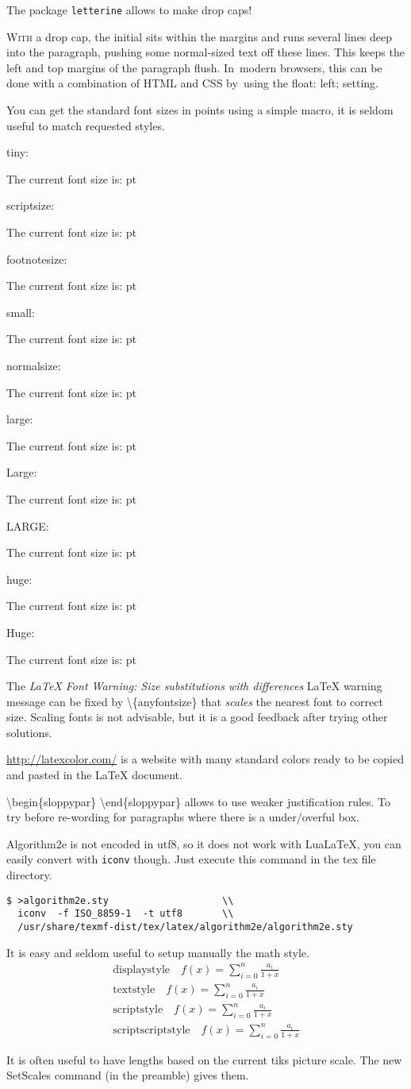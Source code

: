 \documentclass[a4paper]{article}
\makeatletter
\newlength{\scaledx}
\newlength{\scaledy}
\newcommand\SetScales{%
  \pgfpointxy{1}{1}%
  \pgfextractx{\scaledx}{}%
  \pgfextracty{\scaledy}{}%
}
\newcommand\thefontsize[1]{{#1 The current font size is: \f@size pt\par}}
\makeatother
\begin{document}
\vskip5mm
The package \texttt{letterine} allows to make drop caps!

\lettrine[lines=3,slope=-4pt,nindent=-4pt,findent=2pt]{W}{ith} a drop cap, the initial sits
within the margins and runs several lines deep into the paragraph, pushing some
normal-sized text off these lines. This keeps the left and top margins of the
paragraph flush.  In~modern browsers, this can be done with a combination of
HTML and CSS by~using the float: left; setting.

You can get the standard font sizes in points using a simple macro, it is
seldom useful to match requested styles.

tiny: \thefontsize\tiny
scriptsize: \thefontsize\scriptsize
footnotesize: \thefontsize\footnotesize
small: \thefontsize\small
normalsize: \thefontsize\normalsize
large: \thefontsize\large
Large: \thefontsize\Large
LARGE: \thefontsize\LARGE
huge: \thefontsize\huge
Huge: \thefontsize\Huge


The \emph{LaTeX Font Warning: Size substitutions with differences} \LaTeX{}
warning message can be fixed by \textbackslash{}\{anyfontsize\} that
\emph{scales} the nearest font to correct size. Scaling fonts is not advisable,
but it is a good feedback after trying other solutions.



\url{http://latexcolor.com/} is a website with many standard colors ready to be copied
and pasted in the \LaTeX{} document.

\textbackslash{}begin\{sloppypar\} \textbackslash{}end\{sloppypar\} allows to
use weaker justification rules. To try before re-wording for paragraphs where
there is a under/overful box.

Algorithm2e is not encoded in utf8, so it does not work with LuaLaTeX, you can
easily convert with \texttt{iconv} though. Just execute this command in the tex
file directory.
\begin{verbatim}
$ >algorithm2e.sty                    \\
  iconv  -f ISO_8859-1  -t utf8       \\
  /usr/share/texmf-dist/tex/latex/algorithm2e/algorithm2e.sty
\end{verbatim}

It is easy and seldom useful to setup manually the math style.
\begin{eqnarray*}
\mathrm{displaystyle}\quad      \displaystyle      f(x) = \sum_{i=0}^{n} \frac{a_i}{1+x} \\
\mathrm{textstyle}\quad         \textstyle         f(x) = \sum_{i=0}^{n} \frac{a_i}{1+x} \\
\mathrm{scriptstyle}\quad       \scriptstyle       f(x) = \sum_{i=0}^{n} \frac{a_i}{1+x} \\
\mathrm{scriptscriptstyle}\quad \scriptscriptstyle f(x) = \sum_{i=0}^{n} \frac{a_i}{1+x}
\end{eqnarray*}


It is often useful to have lengths based on the current tiks picture scale.  The
new SetScales command (in the preamble) gives them.

\end{document}
